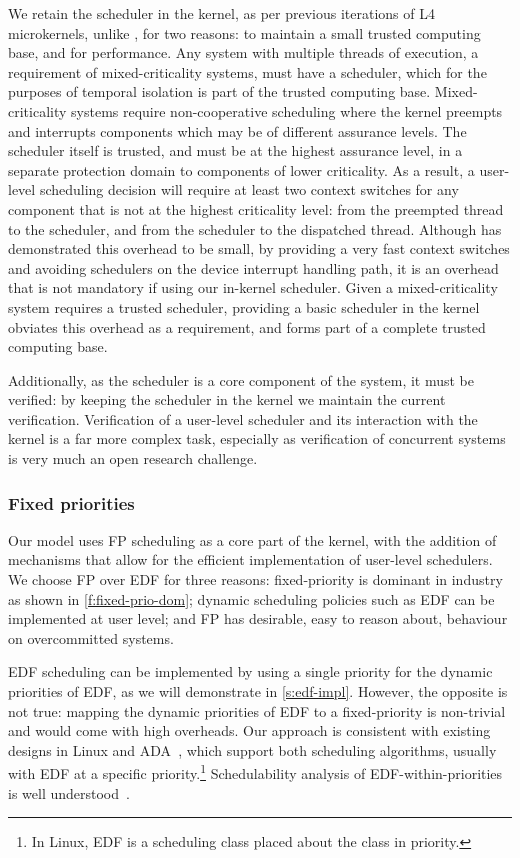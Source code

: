 We retain the scheduler in the kernel, as per previous iterations of L4 microkernels, 
unlike \composite, for two reasons: to
maintain a small trusted computing base, and for performance. Any system with
multiple threads of execution, a requirement of mixed-criticality systems,
must have a scheduler, which for the purposes of temporal isolation is part of
the trusted computing base. Mixed-criticality systems require non-cooperative scheduling where
the kernel preempts and interrupts components which may be of different assurance levels.
The scheduler itself is
trusted, and must be at the highest assurance level, in a separate protection domain to components
of lower criticality.
As a result, a user-level scheduling decision will require at least two context switches for any
component that is not at the highest criticality level:
from the preempted thread to the scheduler, and from the scheduler to the dispatched
thread. Although \composite has demonstrated this overhead to be small, by providing a very fast
context switches and avoiding schedulers on the device interrupt handling path, it is an overhead
that is not mandatory if using our in-kernel scheduler. 
Given a mixed-criticality system requires a trusted scheduler, providing a basic scheduler in the kernel 
obviates this overhead as a requirement, and forms part of a complete trusted computing base.

Additionally, as the scheduler is a core component of the system, it must be
verified: by keeping the
scheduler in the kernel we maintain the current verification. Verification of a user-level scheduler
and its interaction with the kernel is a far more complex task, especially as verification of
concurrent systems is very much an open research challenge. 

\subsubsection{Fixed priorities}

Our model uses \gls{FP} scheduling as a core part of the kernel, with the addition of mechanisms
that allow for the efficient implementation of user-level schedulers.
We choose \gls{FP} over \gls{EDF} for three reasons: 
fixed-priority is dominant in industry
as shown in \cref{f:fixed-prio-dom}; dynamic scheduling policies such as
\gls{EDF} can be implemented at user level; and \gls{FP} has desirable, easy to reason about, behaviour on overcommitted
systems.

\gls{EDF} scheduling can be implemented by using a single priority for the dynamic
priorities of \gls{EDF}, as we will demonstrate in \cref{s:edf-impl}.
However, the opposite is not true: mapping the dynamic priorities of EDF to a fixed-priority
is non-trivial and would come with high overheads. 
Our approach is consistent with existing designs in Linux and ADA~\citep{Burns_Wellings:crtpa}, which
support both scheduling algorithms, usually with \gls{EDF} at a specific priority.\footnote{In
    Linux, \gls{EDF} is a scheduling class placed about the  class in priority.}
Schedulability analysis of \gls{EDF}-within-priorities is well
understood~\citep{Harbour_Palencia_03}.

